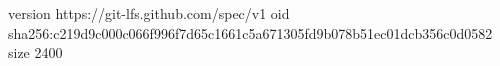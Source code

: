 version https://git-lfs.github.com/spec/v1
oid sha256:c219d9c000c066f996f7d65c1661c5a671305fd9b078b51ec01dcb356c0d0582
size 2400
